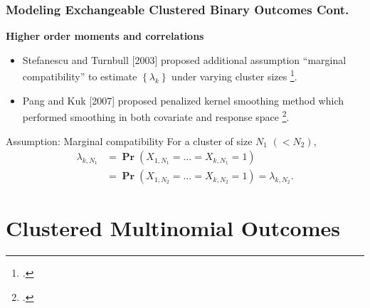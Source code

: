\documentclass[hyperref={bookmarks=false},aspectratio=169]{beamer}
\begin{document}
\begin{frame}
\frametitle{Modeling Exchangeable Clustered Binary Outcomes Cont.}

\textbf{Higher order moments and correlations}

\begin{itemize}
    \item Stefanescu and Turnbull [2003] proposed additional assumption “marginal compatibility” to estimate  $\left\lbrace \lambda_k \right\rbrace$ under varying cluster sizes \footcite{stefanescu2003likelihood}.
    \item Pang and Kuk [2007] proposed penalized kernel smoothing method which performed smoothing in both covariate and response space \footcite{pang2007test}.
\end{itemize}

\begin{block}{Assumption: Marginal compatibility}
For a cluster of size $N_1$ $(< N_2)$,
\begin{equation*}\label{A:marginalCompatibility}
\begin{split}
\lambda_{k,N_1} &= \boldsymbol{\Pr} \left( X_{1,N_1} = \dots = X_{k,N_1} = 1 \right) \\
                &= \boldsymbol{\Pr} \left( X_{1,N_2} = \dots = X_{k,N_2} = 1\right) = \lambda_{k,N_2}.
\end{split}
\end{equation*}
\end{block}

\end{frame}



\section{Clustered Multinomial Outcomes}
\end{document}
